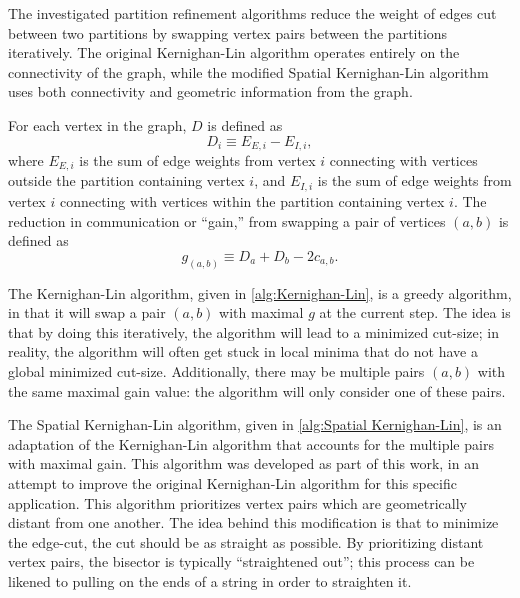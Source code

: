 {{{      The investigated partition refinement algorithms reduce the weight of edges cut between two partitions by swapping vertex pairs between the partitions iteratively.
      The original Kernighan-Lin algorithm operates entirely on the connectivity of the graph, while the modified Spatial Kernighan-Lin algorithm uses both connectivity and geometric information from the graph.

      For each vertex in the graph, $D$ is defined as
      \begin{equation}
          \label{eq:Spatial Decomposition:KL D}
          D_i \equiv E_{E,i} - E_{I,i},
      \end{equation}
      where $E_{E,i}$ is the sum of edge weights from vertex $i$ connecting with vertices outside the partition containing vertex $i$, and $E_{I,i}$ is the sum of edge weights from vertex $i$ connecting with vertices within the partition containing vertex $i$.
      The reduction in communication or ``gain,'' from swapping a pair of vertices $(a,b)$ is defined as
      \begin{equation}
          \label{eq:Spatial Decomposition:KL gain}
          g_{(a,b)} \equiv D_a + D_b - 2c_{a,b}.
      \end{equation}

      The Kernighan-Lin algorithm, given in \cref{alg:Kernighan-Lin}, is a greedy algorithm, in that it will swap a pair $(a,b)$ with maximal $g$ at the current step.
      The idea is that by doing this iteratively, the algorithm will lead to a minimized cut-size; in reality, the algorithm will often get stuck in local minima that do not have a global minimized cut-size.
      Additionally, there may be multiple pairs $(a,b)$ with the same maximal gain value: the algorithm will only consider one of these pairs.

      The Spatial Kernighan-Lin algorithm, given in \cref{alg:Spatial Kernighan-Lin}, is an adaptation of the Kernighan-Lin algorithm that accounts for the multiple pairs with maximal gain.
      This algorithm was developed as part of this work, in an attempt to improve the original Kernighan-Lin algorithm for this specific application.
      This algorithm prioritizes vertex pairs which are geometrically distant from one another.
      The idea behind this modification is that to minimize the edge-cut, the cut should be as straight as possible.
      By prioritizing distant vertex pairs, the bisector is typically ``straightened out''; this process can be likened to pulling on the ends of a string in order to straighten it.

}}}
